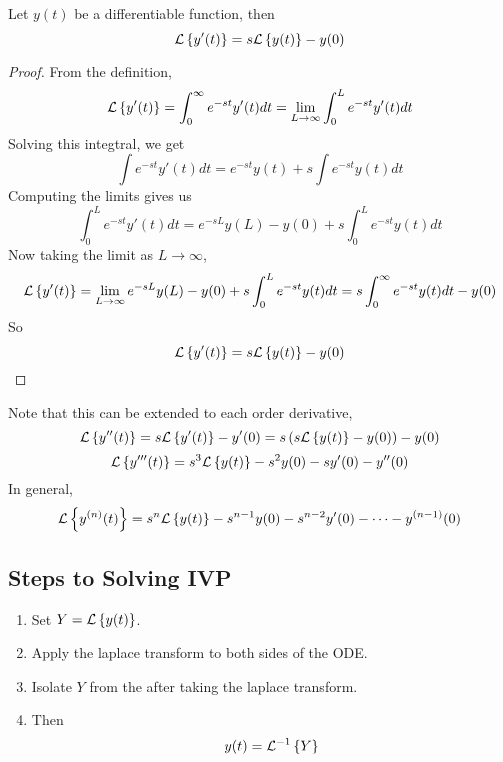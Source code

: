 \documentclass[openany]{report}
\begin{document}
\begin{theorem}
    Let $y(t)$ be a differentiable function, then 
    \[\mathcal{L}\left\{y'(t)\right\} = s\mathcal{L}\left\{y(t)\right\} - y(0)\]
\end{theorem}
\begin{proof}
    From the definition, 
    \[
        \mathcal{L}\left\{y'(t)\right\} = \int_0^\infty e^{-st}y'(t)dt = \lim_{L\rightarrow \infty}\int_0^L e^{-st}y'(t)dt
    \]
    Solving this integtral, we get 
    \[\int e^{-st}y'(t)dt = e^{-st}y(t) + s\int e^{-st}y(t)dt \]
    Computing the limits gives us 
    \[\int_0^L e^{-st}y'(t)dt = e^{-sL}y(L) - y(0) + s\int_0^L e^{-st}y(t)dt\]
    Now taking the limit as $L \rightarrow \infty$, 
    \[\mathcal{L}\left\{y'(t)\right\} = \lim_{L\rightarrow\infty} e^{-sL}y(L) - y(0) + s\int_0^L e^{-st}y(t)dt = s\int_0^\infty e^{-st}y(t)dt - y(0)\]
    So 
    \[\mathcal{L}\left\{y'(t)\right\} = s\mathcal{L}\left\{y(t)\right\} - y(0)\]
\end{proof}
Note that this can be extended to each order derivative, 
\[\mathcal{L}\left\{y''(t)\right\} = s\mathcal{L}\left\{y'(t)\right\} - y'(0) = s\left(s\mathcal{L}\left\{y(t)\right\} - y(0)\right) - y(0)\]
\[\mathcal{L}\left\{y'''(t)\right\} = s^3\mathcal{L}\left\{y(t)\right\} - s^2y(0) - sy'(0)-y''(0)\]
In general, 
\[\mathcal{L}\left\{y^{(n)}(t)\right\} = s^n\mathcal{L}\left\{y(t)\right\} - s^{n-1}y(0) - s^{n-2}y'(0) - \cdots - y^{(n-1)}(0)\]
\subsection{Steps to Solving IVP}
\begin{enumerate}
    \item Set $Y = \mathcal{L}\left\{y(t)\right\}$. 
    \item Apply the laplace transform to both sides of the ODE. 
    \item Isolate $Y$ from the after taking the laplace transform. 
    \item Then
    \[y(t) = \mathcal{L}^{-1}\left\{Y\right\}\]
\end{enumerate}
\end{document}
